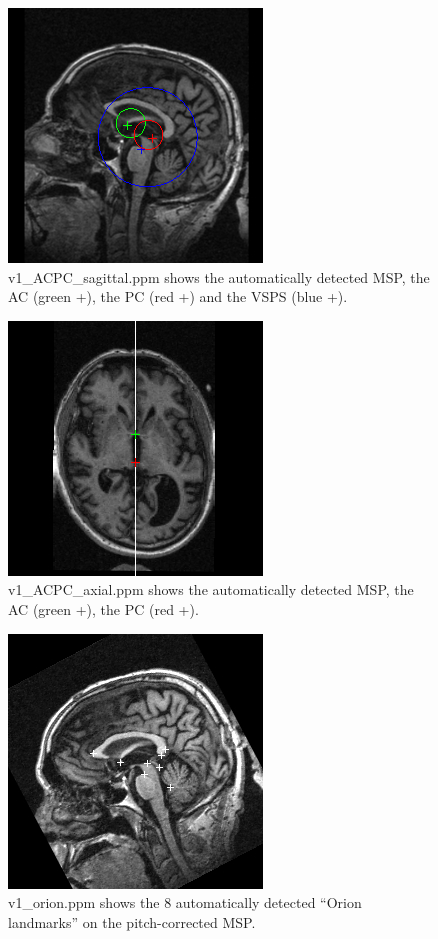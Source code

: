 \documentclass[11pt]{article}
\begin{document}
\begin{figure}[t!]
\begin{center}
\includegraphics[scale=1.0]{v1_ACPC_sagittal.jpg}
\caption{v1\_ACPC\_sagittal.ppm shows the automatically detected MSP, the AC (green +), 
the PC (red +) and the VSPS (blue +).  
}
\label{fig:sagittal}
\end{center}
\end{figure}
\begin{figure}[H]
\begin{center}
\includegraphics[scale=1.0]{v1_ACPC_axial.jpg}
\caption{v1\_ACPC\_axial.ppm shows the automatically detected MSP, the AC (green +), 
the PC (red +).
}
\label{fig:axial}
\end{center}
\end{figure}
\begin{figure}[H]
\begin{center}
\includegraphics[scale=1.0]{v1_orion.jpg}
\caption{v1\_orion.ppm shows the 8 automatically detected
``Orion landmarks'' on the pitch-corrected MSP.
}
\label{fig:orion}
\end{center}
\end{figure}
\end{document}
